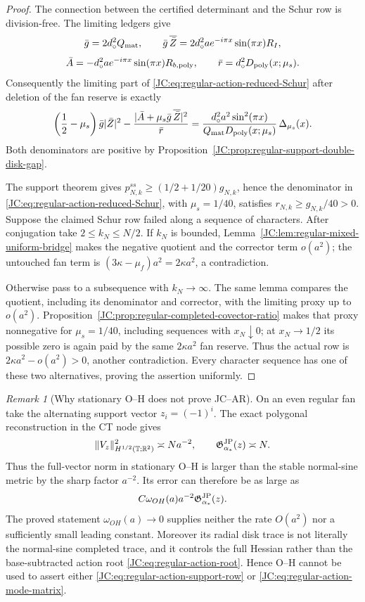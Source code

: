 \documentclass[11pt]{amsart}
\numberwithin{equation}{section}
\theoremstyle{definition}
\theoremstyle{remark}
\newtheorem{remark}[theorem]{Remark}
\newcommand{\Gjp}{\mathfrak G^{\rm JP}}
\begin{document}
\begin{proof}
The connection between the certified determinant and the Schur row is
division-free.  The limiting ledgers give
\[
 \bar g=2d_\circ^2Q_{\rm mat},\qquad
 \bar g\,\overline{\bar Z}
 =2d_\circ^2a e^{-i\pi x}\sin(\pi x)R_I,
\]
\[
 \bar A=-d_\circ^2a e^{-i\pi x}\sin(\pi x)R_{b,{\rm poly}},
 \qquad
 \bar r=d_\circ^2D_{\rm poly}(x;\mu_s).
\]
Consequently the limiting part of
\eqref{JC:eq:regular-action-reduced-Schur} after deletion of the fan reserve
is exactly
\begin{equation}\label{JC:eq:regular-proxy-Schur-determinant}
 \left(\frac12-\mu_s\right)\bar g|\bar Z|^2
 -\frac{|\bar A+\mu_s\bar g\,\overline{\bar Z}|^2}{\bar r}
 =\frac{d_\circ^2a^2\sin^2(\pi x)}
 {Q_{\rm mat}D_{\rm poly}(x;\mu_s)}\,\Delta_{\mu_s}(x).
\end{equation}
Both denominators are positive by
Proposition~\ref{JC:prop:regular-support-double-disk-gap}.

The support theorem gives
$p^{ss}_{N,k}\ge(1/2+1/20)g_{N,k}$, hence the denominator in
\eqref{JC:eq:regular-action-reduced-Schur}, with $\mu_s=1/40$, satisfies
$r_{N,k}\ge g_{N,k}/40>0$.  Suppose the claimed Schur row failed along a
sequence of characters.  After conjugation take $2\le k_N\le N/2$.
If $k_N$ is bounded, Lemma~\ref{JC:lem:regular-mixed-uniform-bridge} makes
the negative quotient and the corrector term $o(a^2)$; the untouched fan
term is $(3\kappa-\mu_f)a^2=2\kappa a^2$, a contradiction.

Otherwise pass to a subsequence with $k_N\to\infty$.  The same lemma
compares the quotient, including its denominator and corrector, with the
limiting proxy up to $o(a^2)$.  Proposition~\ref{JC:prop:regular-completed-covector-ratio}
makes that proxy nonnegative for $\mu_s=1/40$, including sequences with
$x_N\downarrow0$; at $x_N\to1/2$ its possible zero is again paid by the
same $2\kappa a^2$ fan reserve.  Thus the actual row is
$2\kappa a^2-o(a^2)>0$, another contradiction.  Every character sequence
has one of these two alternatives, proving the assertion uniformly.
\end{proof}

\begin{remark}[Why stationary O--H does not prove JC--AR]
On an even regular fan take the alternating support vector
$z_i=(-1)^i$.  The exact polygonal reconstruction in the CT node gives
\[
 \|V_z\|_{H^{1/2}(\mathbb T;\mathbb R^2)}^2\asymp Na^{-2},
 \qquad
 \Gjp_{\alpha_*}(z)\asymp N.
\]
Thus the full-vector norm in stationary O--H is larger than the stable
normal-sine metric by the sharp factor $a^{-2}$.  Its error can therefore
be as large as
\[
 C\omega_{OH}(a)a^{-2}\Gjp_{\alpha_*}(z).
\]
The proved statement $\omega_{OH}(a)\to0$ supplies neither the rate
$O(a^2)$ nor a sufficiently small leading constant.  Moreover its radial
disk trace is not literally the normal-sine completed trace, and it
controls the full Hessian rather than the base-subtracted action root
\eqref{JC:eq:regular-action-root}.  Hence O--H cannot be used to assert either
\eqref{JC:eq:regular-action-support-row} or
\eqref{JC:eq:regular-action-mode-matrix}.
\end{remark}
\end{document}
